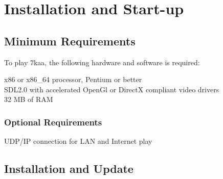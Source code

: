 
\chapter{Installation and Start-up}

\section{Minimum Requirements}

To play 7kaa, the following hardware and software is required:

\begin{adjustwidth}{1cm}{}
x86 or x86\_64 processor, Pentium or better \\
SDL2.0 with accelerated OpenGl or DirectX compliant video drivers \\
32 MB of RAM
\end{adjustwidth}

\subsection{Optional Requirements}

UDP/IP connection for LAN and Internet play

\section{Installation and Update}



